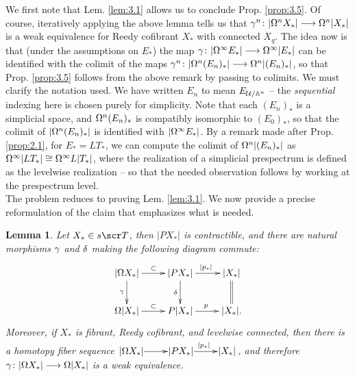 \documentclass{amsart}
\newtheorem{lem}{Lemma}[thm]
\theoremstyle{definition}
\begin{document}
We first note that Lem. \ref{lem:3.1} allows us to conclude Prop. \ref{prop:3.5}. Of course, iteratively applying the above lemma tells us that $\gamma^n \colon |\Omega^n X_*| \longrightarrow \Omega^n|X_*|$ is a weak equivalence for Reedy cofibrant $X_*$ with connected $X_q$. The idea now is that (under the assumptions on $E_*$) the map $\gamma \colon |\Omega^{\infty} E_*| \longrightarrow \Omega^{\infty}|E_*|$ can be identified with the colimit of the maps $\gamma^n \colon |\Omega^n (E_n)_*| \longrightarrow \Omega^n|(E_n)_*|$, so that Prop. \ref{prop:3.5} follows from the above remark by passing to colimits. We must clarify the notation used. We have written $E_n$  to mean $E_{{\mathcal{U}}/\mathbb{A}^n}$ -- the \emph{sequential} indexing here is chosen purely for simplicity. Note that each $(E_n)_*$ is a simplicial space, and $\Omega^n (E_n)_*$ is compatibly isomorphic to $(E_0)_*$, so that the colimit of $|\Omega^n (E_n)_*|$ is identified with $|\Omega^{\infty}E_*|$. By a remark made after Prop. \ref{prop:2.1}, for $E_* = LT_*$, we can compute the colimit of $\Omega^n |(E_n)_*|$ as $\Omega^{\infty} |L T_*| \cong \Omega^{\infty} L|T_*|$, where the realization of a simplicial prespectrum is defined as the levelwise realization -- so that the needed observation follows by working at the prespectrum level.\\

The problem reduces to proving Lem. \ref{lem:3.1}. We now provide a precise reformulation of the claim that emphasizes what is needed.
\begin{lem}
Let $X_* \in s\sT$, then $|PX_*|$ is contractible, and there are natural morphisms $\gamma$ and $\delta$ making the following diagram commute:
\[
\xymatrix{
|\OM X_*| \ar[r]^{\subset} \ar[d]_{\ga} & |PX_*| \ar[d]_{\de} \ar[r]^{|p_*|} & |X_*| \ar@{=}[d]\\
\OM |X_*| \ar[r]^{\subset} & P|X_*| \ar[r]^p & |X_*|.
}
\]
\noindent Moreover, if $X_*$ is fibrant, Reedy cofibrant, and levelwise connected, then there is a homotopy fiber sequence $\xymatrix@1{|\OM X_*| \ar[r] & |PX_*| \ar[r]^{|p_*|} & |X_*|}$, and therefore $\gamma \colon |\Omega X_*| \longrightarrow \Omega|X_*|$ is a weak equivalence.
\end{lem}
\end{document}
